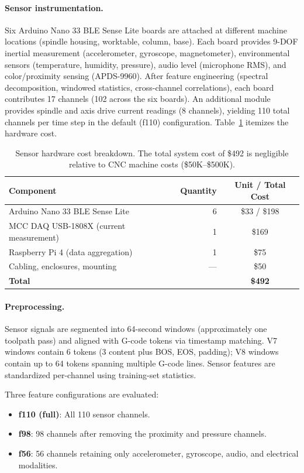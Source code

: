 \paragraph{Sensor instrumentation.}
Six Arduino Nano 33 BLE Sense Lite boards are attached at different machine locations (spindle housing, worktable, column, base).
Each board provides 9-DOF inertial measurement (accelerometer, gyroscope, magnetometer), environmental sensors (temperature, humidity, pressure), audio level (microphone RMS), and color/proximity sensing (APDS-9960).
After feature engineering (spectral decomposition, windowed statistics, cross-channel correlations), each board contributes 17 channels (102 across the six boards).
An additional module provides spindle and axis drive current readings (8 channels), yielding 110 total channels per time step in the default (f110) configuration.
Table~\ref{tab:sensor_cost} itemizes the hardware cost.

\begin{table}[t]
\centering
\caption{Sensor hardware cost breakdown. The total system cost of \$492 is negligible relative to CNC machine costs (\$50K--\$500K).}
\label{tab:sensor_cost}
\begin{tabular}{@{}lrc@{}}
\toprule
Component & Quantity & Unit / Total Cost \\
\midrule
Arduino Nano 33 BLE Sense Lite & 6 & \$33 / \$198 \\
MCC DAQ USB-1808X (current measurement) & 1 & \$169 \\
Raspberry Pi 4 (data aggregation) & 1 & \$75 \\
Cabling, enclosures, mounting & --- & \$50 \\
\midrule
\textbf{Total} & & \textbf{\$492} \\
\bottomrule
\end{tabular}
\end{table}

\paragraph{Preprocessing.}
Sensor signals are segmented into 64-second windows (approximately one toolpath pass) and aligned with G-code tokens via timestamp matching.
V7 windows contain 6 tokens (3 content plus BOS, EOS, padding); V8 windows contain up to 64 tokens spanning multiple G-code lines.
Sensor features are standardized per-channel using training-set statistics.

Three feature configurations are evaluated:
\begin{itemize}
    \item \textbf{f110 (full)}: All 110 sensor channels.
    \item \textbf{f98}: 98 channels after removing the proximity and pressure channels.
    \item \textbf{f56}: 56 channels retaining only accelerometer, gyroscope, audio, and electrical modalities.
\end{itemize}

